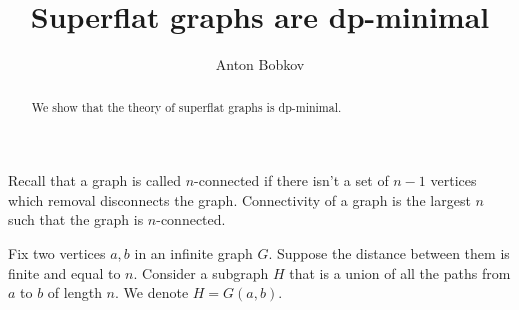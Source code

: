 \documentclass{amsart}
\begin{document}
\title{Superflat graphs are dp-minimal}
\author{Anton Bobkov}

\begin{abstract}
	We show that the theory of superflat graphs is dp-minimal.
\end{abstract}

\maketitle

Recall that a graph is called $n$-connected if there isn't a set of $n-1$ vertices which removal disconnects the graph. Connectivity of a graph is the largest $n$ such that the graph is $n$-connected.

\begin{Definition}
	Fix two vertices $a,b$ in an infinite graph $G$. Suppose the distance between them is finite and equal to $n$. Consider a subgraph $H$ that is a union of all the paths from $a$ to $b$ of length $n$. We denote $H = G(a,b)$.
\end{Definition}
\end{document}
